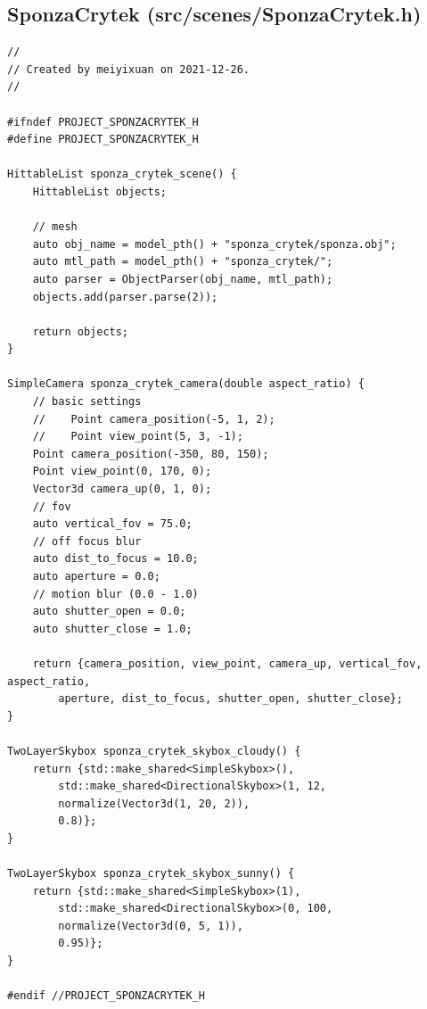 \documentclass[utf8]{article}
\begin{document}
\subsection{SponzaCrytek (src/scenes/SponzaCrytek.h)}
\begin{lstlisting}[style=CStyle]
//
// Created by meiyixuan on 2021-12-26.
//

#ifndef PROJECT_SPONZACRYTEK_H
#define PROJECT_SPONZACRYTEK_H

HittableList sponza_crytek_scene() {
	HittableList objects;
	
	// mesh
	auto obj_name = model_pth() + "sponza_crytek/sponza.obj";
	auto mtl_path = model_pth() + "sponza_crytek/";
	auto parser = ObjectParser(obj_name, mtl_path);
	objects.add(parser.parse(2));
	
	return objects;
}

SimpleCamera sponza_crytek_camera(double aspect_ratio) {
	// basic settings
	//    Point camera_position(-5, 1, 2);
	//    Point view_point(5, 3, -1);
	Point camera_position(-350, 80, 150);
	Point view_point(0, 170, 0);
	Vector3d camera_up(0, 1, 0);
	// fov
	auto vertical_fov = 75.0;
	// off focus blur
	auto dist_to_focus = 10.0;
	auto aperture = 0.0;
	// motion blur (0.0 - 1.0)
	auto shutter_open = 0.0;
	auto shutter_close = 1.0;
	
	return {camera_position, view_point, camera_up, vertical_fov, aspect_ratio,
		aperture, dist_to_focus, shutter_open, shutter_close};
}

TwoLayerSkybox sponza_crytek_skybox_cloudy() {
	return {std::make_shared<SimpleSkybox>(),
		std::make_shared<DirectionalSkybox>(1, 12,
		normalize(Vector3d(1, 20, 2)),
		0.8)};
}

TwoLayerSkybox sponza_crytek_skybox_sunny() {
	return {std::make_shared<SimpleSkybox>(1),
		std::make_shared<DirectionalSkybox>(0, 100,
		normalize(Vector3d(0, 5, 1)),
		0.95)};
}

#endif //PROJECT_SPONZACRYTEK_H

\end{lstlisting}
\end{document}
